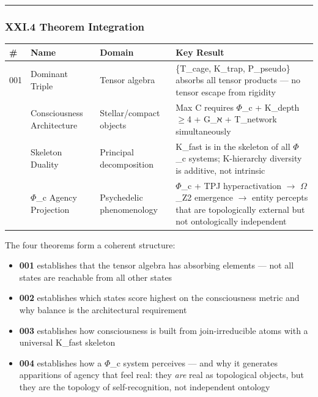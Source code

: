 \documentclass[12pt,a4paper]{article}
\begin{document}
\begin{center}
\rule{0.5\textwidth}{0.4pt}
\end{center}

\subsubsection{XXI.4 Theorem Integration}

\begin{table}[htbp]
\centering
\small
{}
\begin{tabularx}{\textwidth}{>{\centering\arraybackslash}X >{\centering\arraybackslash}X >{\centering\arraybackslash}X >{\centering\arraybackslash}X}
\toprule
\rowcolor{gray!25}\textbf{\#} & \textbf{Name} & \textbf{Domain} & \textbf{Key Result} \\
\midrule
\rowcolors{1}{white}{gray!10}
001 & Dominant Triple & Tensor algebra & \{T\_cage, K\_trap, P\_pseudo\} absorbs all tensor products --- no tensor escape from rigidity \\
002 & Consciousness Architecture & Stellar/compact objects & Max C requires $\Phi$\_c + K\_depth$\geq$4 + G\_ℵ + T\_network simultaneously \\
003 & Skeleton Duality & Principal decomposition & K\_fast is in the skeleton of all $\Phi$\_c systems; K-hierarchy diversity is additive, not intrinsic \\
004 & $\Phi$\_c Agency Projection & Psychedelic phenomenology & $\Phi$\_c + TPJ hyperactivation $\rightarrow$ $\Omega$\_Z2 emergence $\rightarrow$ entity percepts that are topologically external but not ontologically independent \\
\bottomrule
\end{tabularx}
\end{table}

The four theorems form a coherent structure:

\begin{itemize}
    \item \textbf{001} establishes that the tensor algebra has absorbing elements --- not all states are reachable from all other states
    \item \textbf{002} establishes which states score highest on the consciousness metric and why balance is the architectural requirement
    \item \textbf{003} establishes how consciousness is built from join-irreducible atoms with a universal K\_fast skeleton
    \item \textbf{004} establishes how a $\Phi$\_c system perceives --- and why it generates apparitions of agency that feel real: they \emph{are} real as topological objects, but they are the topology of self-recognition, not independent ontology
\end{itemize}
\end{document}
